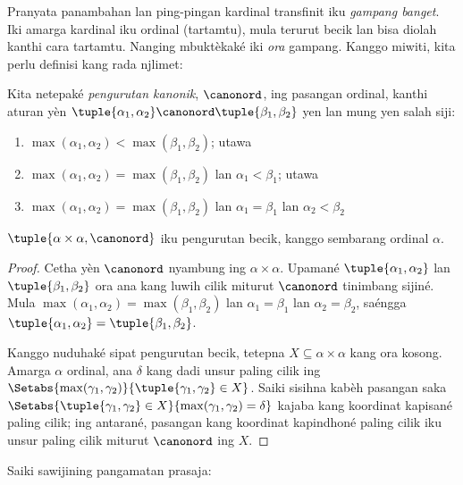 \documentclass[../../../include/open-logic-section]{subfiles}
\begin{document}


Pranyata panambahan lan ping-pingan kardinal transfinit iku
\emph{gampang banget}. Iki amarga kardinal iku ordinal
(tartamtu), mula terurut becik lan bisa diolah kanthi cara
tartamtu. Nanging mbuktèkaké iki \emph{ora} gampang.
Kanggo miwiti, kita perlu definisi kang rada njlimet:

\begin{defn}
Kita netepaké \emph{pengurutan kanonik}, $\canonord$,
ing pasangan ordinal, kanthi aturan yèn $\tuple{\alpha_1, \alpha_2} \canonord
\tuple{\beta_1, \beta_2}$ yen lan mung yen salah siji:
\begin{enumerate}
	\item $\max(\alpha_1, \alpha_2) < \max(\beta_1, \beta_2)$; utawa
	\item $\max(\alpha_1, \alpha_2) = \max(\beta_1, \beta_2)$ lan
	$\alpha_1 < \beta_1$; utawa
	\item $\max(\alpha_1, \alpha_2) = \max(\beta_1, \beta_2)$ lan
	$\alpha_1 = \beta_1$ lan $\alpha_2 < \beta_2$
\end{enumerate}
\end{defn}

\begin{lem}
$\tuple{\alpha \times \alpha, \canonord}$ iku pengurutan becik,
kanggo sembarang ordinal $\alpha$.
\end{lem}

\begin{proof}
Cetha yèn $\canonord$ nyambung ing $\alpha \times \alpha$.
Upamané $\tuple{\alpha_1, \alpha_2}$ lan $\tuple{\beta_1,
\beta_2}$ ora ana kang luwih cilik miturut $\canonord$
tinimbang sijiné. Mula $\max(\alpha_1,
\alpha_2) = \max(\beta_1, \beta_2)$ lan $\alpha_1 = \beta_1$ lan
$\alpha_2 = \beta_2$, saéngga $\tuple{\alpha_1, \alpha_2} =
\tuple{\beta_1,  \beta_2}$.

Kanggo nuduhaké sipat pengurutan becik, tetepna
$X \subseteq \alpha\times\alpha$ kang ora kosong.
Amarga $\alpha$ ordinal, ana $\delta$ kang dadi unsur
paling cilik ing $\Setabs{\max(\gamma_1, \gamma_2)}{\tuple{\gamma_1,
\gamma_2} \in X}$. Saiki sisihna kabèh pasangan saka
$\Setabs{\tuple{\gamma_1,\gamma_2} \in X}{\max(\gamma_1, \gamma_2) =
\delta}$ kajaba kang koordinat kapisané paling cilik;
ing antarané, pasangan kang koordinat kapindhoné
paling cilik iku unsur paling cilik miturut $\canonord$ ing $X$.
\end{proof}
\noindent
Saiki sawijining pangamatan prasaja:
\end{document}
